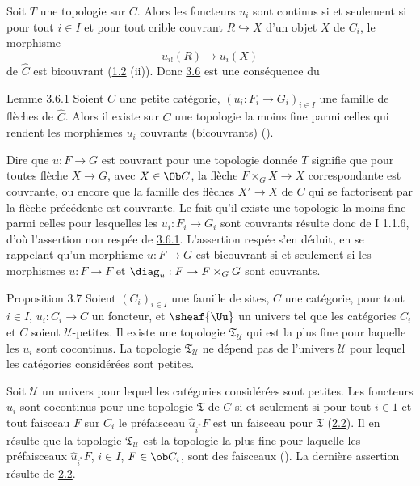 Soit $T$ une topologie sur $C$. Alors les foncteurs $u_i$ sont
continus si et seulement si pour tout $i\in I$ et pour tout crible
couvrant $R\hookrightarrow X$ d'un objet $X$ de $C_i$,\pageoriginale
le morphisme
$$
u_{i!}(R)\longrightarrow u_i(X)
$$
de $\widehat{C}$ est bicouvrant (\hyperref[III.prop1.2]{1.2} (ii)). Donc
\hyperref[III.prop3.6]{3.6} est une conséquence du

\begin{enonce*}{Lemme 3.6.1}
Soient $C$ une petite catégorie, $(u_i:F_i\rightarrow G_i)_{i\in
I}$ une famille de flèches de $\widehat{C}$. Alors il existe sur
$C$ une topologie la moins fine parmi celles qui rendent les
morphismes $u_i$ couvrants (\resp bicouvrants)
{\rm()}.
\end{enonce*}

Dire que $u:F\rightarrow G$ est couvrant pour une topologie
donnée $T$ signifie que pour toutes flèche $X\rightarrow G$,
avec $X\in \Ob C$, la flèche $F\times_G X\rightarrow X$
correspondante est couvrante, ou encore que la famille des flèches
$X'\rightarrow X$ de $C$ qui se factorisent par la flèche
précédente est couvrante. Le fait qu'il existe une topologie
la moins fine parmi celles pour lesquelles les $u_i:F_i\rightarrow
G_i$ sont couvrants résulte donc de I 1.1.6, d'où l'assertion
non respée de \hyperref[III.lem3.6.1]{3.6.1}. L'assertion respée s'en
déduit, en se rappelant qu'un morphisme $u:F\rightarrow G$ est
bicouvrant si et seulement si les morphismes $u:F\rightarrow F$ et
$\diag_u:F\rightarrow F\times_G G$ sont couvrants.

\begin{enonce*}{Proposition 3.7}
Soient $(C_i)_{i\in I}$ une famille de sites, $C$ une catégorie,
pour tout $i\in I$, $u_i:C_i\rightarrow C$ un foncteur, et
$\sheaf{\Uu}$ un univers tel que les catégories $C_i$ et $C$
soient $𝒰$-petites. Il existe une topologie
$\mathfrak{T}_{𝒰}$ qui est la plus fine pour laquelle les
$u_i$ sont cocontinus. La topologie $\mathfrak{T}_{𝒰}$ ne
dépend pas de l'univers $𝒰$ pour lequel les
catégories considérées sont petites.
\end{enonce*}

Soit $𝒰$ un univers pour lequel les catégories
considérées sont petites. Les foncteurs $u_i$ sont
cocontinus pour une topologie $\mathfrak{T}$ de $C$ si et seulement
si pour tout $i\in 1$ et tout faisceau $F$ sur $C_i$ le
préfaisceau $\widehat{u}_{i^{\ast}}F$ est un faisceau pour
$\mathfrak{T}$ (\hyperref[III.prop2.2]{2.2}). Il en résulte que la
topologie $\mathfrak{T}_{𝒰}$ est la topologie la plus fine
pour laquelle les préfaisceaux $\widehat{u}_{i^\ast}F$, $i\in
I$, $F\in \ob C_i$, sont des faisceaux (). La
dernière assertion résulte de \hyperref[III.prop2.2]{2.2}.

